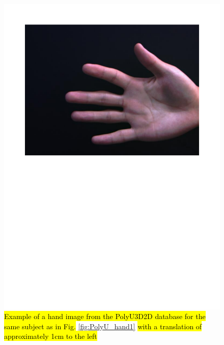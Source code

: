 \documentclass[review]{elsarticle}
\begin{document}
		\begin{figure}[!h]
		    \centering
		    \includegraphics[page=3,scale=.57,trim=1cm 14.7cm 1cm 1.5cm,clip]{PolyU3D2D_samples.pdf}
		    \caption{\hl{Example of a hand image from the PolyU3D2D database for the same subject as in Fig.} \ref{fig:PolyU_hand1} \hl{with a translation of approximately 1cm to the left}}
		    \label{fig:PolyU_hand3}
		\end{figure}
\end{document}
